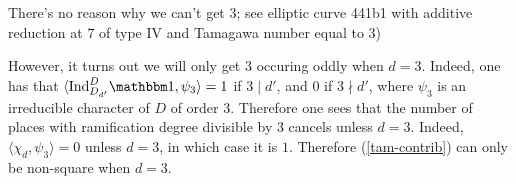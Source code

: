 \begin{rem}
   There's no reason why we can't get 3; see elliptic curve 441b1 with additive reduction at $7$ of type IV and Tamagawa number equal to $3$) 
\end{rem}


However, it turns out we will only get $3$ occuring oddly when $d = 3$. Indeed, one has that $\langle \Ind_{D_{d'}}^D \trivial, \psi_3 \rangle = 1$ if $3 \mid d'$, and $0$ if $3 \nmid d'$, where $\psi_3$ is an irreducible character of $D$ of order $3$. Therefore one sees that the number of places with ramification degree divisible by $3$ cancels unless $d = 3$. Indeed, $\langle \chi_d , \psi_3 \rangle = 0$ unless $d = 3$, 
in which case it is $1$. Therefore (\ref{tam-contrib}) can only be non-square when $d = 3$.
